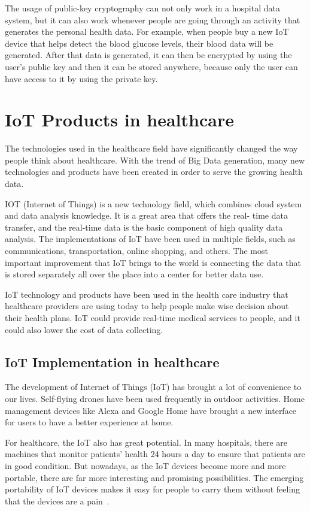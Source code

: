 The usage of public-key cryptography can not only work
 in a hospital data 
system, but it can also work whenever people are going 
through an activity 
that generates the personal health data. For example, 
when people buy a 
new IoT device that helps detect the blood glucose 
levels, their blood data will 
be generated. After that data is generated, it can then be encrypted 
by using the user’s public key and then it can be stored anywhere, 
because 
only the user can have access to it by using the private key.

\section{IoT Products in healthcare}
The technologies used in the healthcare field have significantly 
changed the way people think about healthcare. With the trend of Big 
Data generation, many new technologies and products have been created 
in order to serve the growing health data. 

IOT (Internet of Things) is a new technology field, which combines cloud
system and data analysis knowledge. It is a great area that offers the real-
time data transfer, and the real-time data 
is the basic component of high quality data analysis. The implementations 
of IoT have been used in multiple fields, such as communications, 
transportation, online shopping, and others. The most important 
improvement that IoT brings to the world is connecting the data that is stored
separately all over the place into a center for better data use.

IoT technology and products have been used in the health 
care industry that healthcare providers are using today to help people make 
wise decision about their health plans. IoT could provide real-time medical 
services to people, and it could also lower the cost of data collecting.

\subsection{IoT Implementation in healthcare}
The development of Internet of Things (IoT) has brought 
a lot of convenience 
to our lives. Self-flying drones have been used frequently 
in outdoor activities. 
Home management devices like Alexa and Google 
Home have brought a new 
interface for users to have a better experience at home. 

For healthcare, the IoT also has great potential. 
In many hospitals, there 
are machines that monitor patients' health 24 hours a 
day to ensure that 
patients are in good condition. But nowadays, 
as the IoT devices become 
more and more portable, there are far more 
interesting and promising 
possibilities. The emerging portability of IoT devices 
makes it easy for people 
to carry them without feeling that the devices are a pain~\cite{iot}. 

